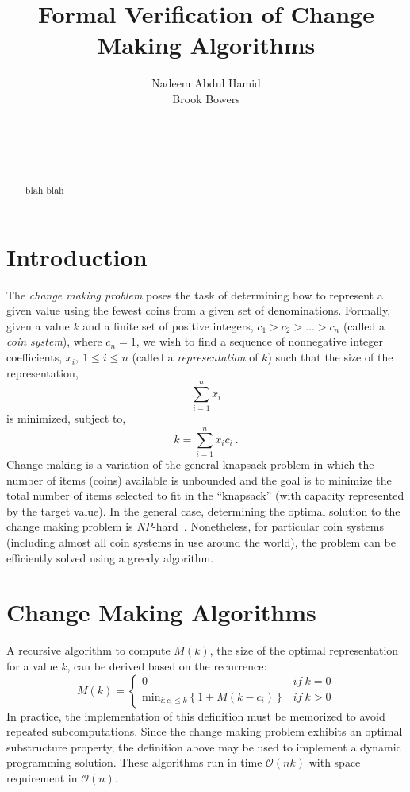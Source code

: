 \documentclass{acm_proc_article-sp}
\title{Formal Verification of Change Making Algorithms}
\author{
\alignauthor
Nadeem Abdul Hamid\\
  \email{nadeem@acm.org}
\alignauthor
Brook Bowers\\
  \email{brook.bowers@vikings.berry.edu}
\and
  \affaddr{Berry College} \\
   \affaddr{Department of Mathematics and Computer Science}\\
  \affaddr{Mount Berry, GA 30149}\\
}
\begin{document}
\maketitle

\begin{abstract}
blah blah
\end{abstract}




\section{Introduction}

The \emph{change making problem} poses the task of determining how to represent a given value using the fewest coins from a given set of denominations. Formally, given a value $k$ and a finite set of positive integers, $c_1 > c_2 > \ldots > c_n$ (called a \emph{coin system}), where $c_n = 1$, we wish to find a sequence of nonnegative integer coefficients, $x_i,\ 1 \le i \le n$ (called a \emph{representation} of $k$) such that the size of the representation,
\[ \sum_{i=1}^{n}x_i \]
is minimized, subject to,
\[ k = \sum_{i=1}^{n}{x_i c_i}\ . \]
Change making is a variation of the general knapsack problem in which the number of items (coins) available is unbounded and the goal is to minimize the total number of items selected to fit in the ``knapsack'' (with capacity represented by the target value). In the general case, determining the optimal solution to the change making problem is \emph{NP}-hard~\cite{?}. Nonetheless, for particular coin systems (including almost all coin systems in use around the world), the problem can be efficiently solved using a greedy algorithm. 


\section{Change Making Algorithms}

A recursive algorithm to compute $M(k)$, the size of the optimal representation for a value $k$, can be derived based on the recurrence:
\[
M(k) = \left\{ 
	\begin{array}{lr}
	0 & \textit{if}~k=0\\
	\textrm{min}_{i:c_i \le k}\left\{1 + M(k - c_i)\right\}   & \textit{if}~k>0
	\end{array}\right.
\]
In practice, the implementation of this definition must be memorized to avoid repeated subcomputations. Since the change making problem exhibits an optimal substructure property, the definition above may be used to implement a dynamic programming solution. These algorithms run in time $\mathcal{O}(nk)$ with space requirement in $\mathcal{O}(n)$. 
\end{document}
